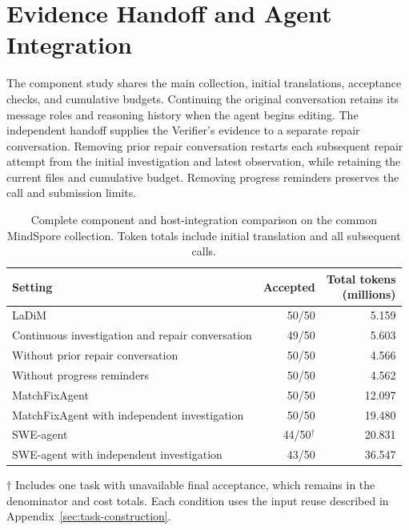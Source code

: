 \documentclass{article}
\newcommand{\thead}[1]{\textbf{\shortstack[b]{#1}}}
\begin{document}
\section{Evidence Handoff and Agent Integration}
\label{sec:component-study}

The component study shares the main collection, initial translations, acceptance checks, and cumulative budgets. Continuing the original conversation retains its message roles and reasoning history when the agent begins editing. The independent handoff supplies the Verifier's evidence to a separate repair conversation. Removing prior repair conversation restarts each subsequent repair attempt from the initial investigation and latest observation, while retaining the current files and cumulative budget. Removing progress reminders preserves the call and submission limits.

\begin{table}[!htb]
\caption{Complete component and host-integration comparison on the common MindSpore collection. Token totals include initial translation and all subsequent calls.}
\label{tab:components}
\centering
\small
\setlength{\tabcolsep}{4pt}

\begin{tabular*}{\linewidth}{@{\extracolsep{\fill}}lrr@{}}
\toprule
\textbf{Setting} & \textbf{Accepted} & \thead{Total tokens\\(millions)} \\
\midrule
LaDiM & 50/50 & 5.159 \\
Continuous investigation and repair conversation & 49/50 & 5.603 \\
Without prior repair conversation & 50/50 & 4.566 \\
Without progress reminders & 50/50 & 4.562 \\
MatchFixAgent & 50/50 & 12.097 \\
MatchFixAgent with independent investigation & 50/50 & 19.480 \\
SWE-agent & 44/50$^{\dagger}$ & 20.831 \\
SWE-agent with independent investigation & 43/50 & 36.547 \\
\bottomrule
\end{tabular*}


\par\vspace{3pt}
\begin{minipage}{\linewidth}
\footnotesize $\dagger$ Includes one task with unavailable final acceptance, which remains in the denominator and cost totals. Each condition uses the input reuse described in Appendix~\ref{sec:task-construction}.
\end{minipage}
\end{table}
\end{document}
